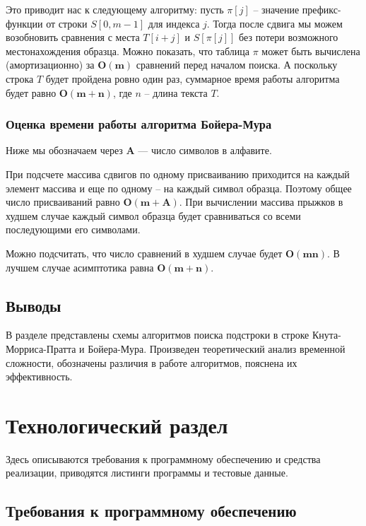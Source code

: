 \documentclass[a4paper,12pt]{article}
\begin{document}
Это приводит нас к следующему алгоритму: пусть
$\pi[j]$ -- значение префикс-функции от 
строки $S[0, m - 1]$ для индекса $j$. 
Тогда после сдвига мы можем возобновить сравнения с 
места $T[i + j]$ и $S[\pi[j]]$ без потери возможного 
местонахождения образца. Можно показать, 
что таблица 
$\pi$ может быть вычислена (амортизационно) 
за $\mathbf{O(m)}$ сравнений перед 
началом поиска. А поскольку строка $T$ будет 
пройдена 
ровно один раз, суммарное время работы алгоритма 
будет равно $\mathbf{O(m + n)}$, где $n$ -- длина 
текста $T$. ~\cite{knuth}

\subsubsection{Оценка времени работы алгоритма Бойера-Мура}

Ниже мы обозначаем через $\mathbf{A}$ — число символов в алфавите.

При подсчете массива сдвигов по одному присваиванию приходится
на каждый элемент массива и еще по одному -- на каждый символ
образца. Поэтому общее число присваиваний равно $\mathbf{O(m + A)}$.
При вычислении массива прыжков в худшем случае каждый символ
образца будет сравниваться со всеми последующими его символами.

Можно подсчитать, что число сравнений в худшем случае
будет $\mathbf{O(mn)}$. В лучшем случае асимптотика равна $\mathbf{O(m + n)}$.
~\cite{eng_bm}


\subsection*{Выводы}

В разделе представлены схемы алгоритмов поиска подстроки в строке
Кнута-Морриса-Пратта и Бойера-Мура.
Произведен теоретический анализ
временной сложности, обозначены различия в работе алгоритмов,
пояснена их эффективность.

\section{Технологический раздел}

Здесь описываются требования к программному 
обеспечению и средства реализации, приводятся листинги 
программы и тестовые данные.

\subsection{Требования к программному обеспечению}
\end{document}
